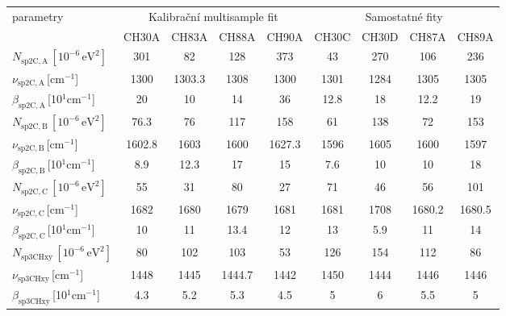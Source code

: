 \begin{tabular}{lcccccccc}
\hline
parametry & \multicolumn{4}{c}{Kalibrační multisample fit} & \multicolumn{4}{c}{Samostatné fity}\\
 & CH30A & CH83A & CH88A & CH90A & CH30C & CH30D & CH87A & CH89A\\
\hline
$N_\mathrm{sp2C,A}\,[10^{-6}\,\mathrm{eV}^2]$ & 301 & 82 & 128 & 373 & 43 & 270 & 106 & 236\\
$\nu_\mathrm{sp2C,A}$\,[cm$^{-1}$] & 1300 & 1303.3 & 1308 & 1300 & 1301 & 1284 & 1305 & 1305\\
$\beta_\mathrm{sp2C,A}$\,[10$^1$cm$^{-1}$] & 20 & 10 & 14 & 36 & 12.8 & 18 & 12.2 & 19\\
$N_\mathrm{sp2C,B}\,[10^{-6}\,\mathrm{eV}^2]$ & 76.3 & 76 & 117 & 158 & 61 & 138 & 72 & 153\\
$\nu_\mathrm{sp2C,B}$\,[cm$^{-1}$] & 1602.8 & 1603 & 1600 & 1627.3 & 1596 & 1605 & 1600 & 1597\\
$\beta_\mathrm{sp2C,B}$\,[10$^1$cm$^{-1}$] & 8.9 & 12.3 & 17 & 15 & 7.6 & 10 & 10 & 18\\
$N_\mathrm{sp2C,C}\,[10^{-6}\,\mathrm{eV}^2]$ & 55 & 31 & 80 & 27 & 71 & 46 & 56 & 101\\
$\nu_\mathrm{sp2C,C}$\,[cm$^{-1}$] & 1682 & 1680 & 1679 & 1681 & 1681 & 1708 & 1680.2 & 1680.5\\
$\beta_\mathrm{sp2C,C}$\,[10$^1$cm$^{-1}$] & 10 & 11 & 13.4 & 12 & 13 & 5.9 & 11 & 14\\
$N_\mathrm{sp3CHxy}\,[10^{-6}\,\mathrm{eV}^2]$ & 80 & 102 & 103 & 53 & 126 & 154 & 112 & 86\\
$\nu_\mathrm{sp3CHxy}$\,[cm$^{-1}$] & 1448 & 1445 & 1444.7 & 1442 & 1450 & 1444 & 1446 & 1446\\
$\beta_\mathrm{sp3CHxy}$\,[10$^1$cm$^{-1}$] & 4.3 & 5.2 & 5.3 & 4.5 & 5 & 6 & 5.5 & 5\\
\hline
\end{tabular}
